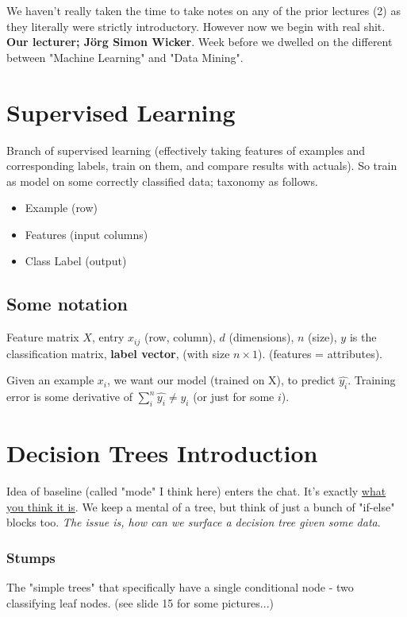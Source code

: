 \documentclass{article}
\begin{document}
We haven't really taken the time to take notes on any of the prior lectures (2) as they literally were strictly introductory. However now we begin with real shit. \textbf{Our lecturer; Jörg Simon Wicker}. Week before we dwelled on the different between "Machine Learning" and "Data Mining".

\section*{Supervised Learning}
Branch of supervised learning (effectively taking features of examples and corresponding labels, train on them, and compare results with actuals). So train as model on some correctly classified data; taxonomy as follows.

\begin{itemize}
				\item Example (row)
				\item Features (input columns)
				\item Class Label (output)
\end{itemize}

\subsection*{Some notation}
Feature matrix $X$, entry $x_{ij}$ (row, column), $d$ (dimensions), $n$ (size), $y$ is the classification matrix, {\bf label vector}, (with size $n \times 1$). (features = attributes).

Given an example $x_i$, we want our model (trained on X), to predict $\hat{y_i}$. Training error is some derivative of $\sum_{i}^{n}{\hat{y_i} \neq {y_i}}$ (or just for some $i$).

\section*{Decision Trees Introduction}
Idea of baseline (called "mode" I think here) enters the chat. It's exactly \href{https://en.wikipedia.org/wiki/Decision_tree}{what you think it is}. We keep a mental of a tree, but think of just a bunch of "if-else" blocks too. {\it The issue is, how can we surface a decision tree given some data}.

\subsubsection*{Stumps}
The "simple trees" that specifically have a single conditional node - two classifying leaf nodes. (see slide 15 for some pictures...)
\end{document}
